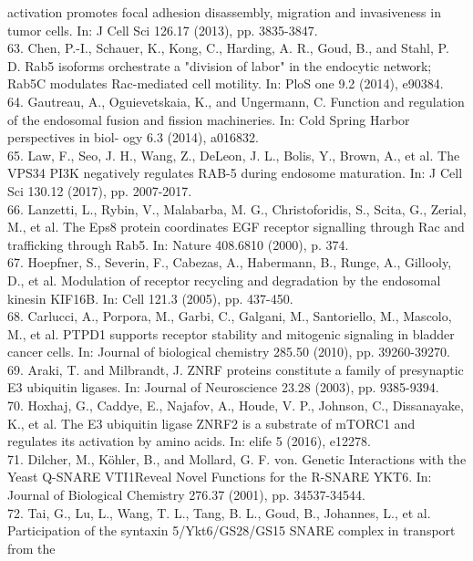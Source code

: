 \documentclass[12pt,english]{article}
\begin{document}
activation promotes focal adhesion disassembly, migration and invasiveness in tumor
cells. In: J Cell Sci 126.17 (2013), pp. 3835-3847.
\\
63. Chen, P.-I., Schauer, K., Kong, C., Harding, A. R., Goud, B., and Stahl, P. D. Rab5
isoforms orchestrate a "division of labor" in the endocytic network; Rab5C modulates
Rac-mediated cell motility. In: PloS one 9.2 (2014), e90384.
\\
64. Gautreau, A., Oguievetskaia, K., and Ungermann, C. Function and regulation of the
endosomal fusion and fission machineries. In: Cold Spring Harbor perspectives in biol-
ogy 6.3 (2014), a016832.
\\
65. Law, F., Seo, J. H., Wang, Z., DeLeon, J. L., Bolis, Y., Brown, A., et al. The VPS34
PI3K negatively regulates RAB-5 during endosome maturation. In: J Cell Sci 130.12
(2017), pp. 2007-2017.
\\
66. Lanzetti, L., Rybin, V., Malabarba, M. G., Christoforidis, S., Scita, G., Zerial, M., et
al. The Eps8 protein coordinates EGF receptor signalling through Rac and trafficking
through Rab5. In: Nature 408.6810 (2000), p. 374.
\\
67. Hoepfner, S., Severin, F., Cabezas, A., Habermann, B., Runge, A., Gillooly, D., et al.
Modulation of receptor recycling and degradation by the endosomal kinesin KIF16B.
In: Cell 121.3 (2005), pp. 437-450.
\\
68. Carlucci, A., Porpora, M., Garbi, C., Galgani, M., Santoriello, M., Mascolo, M., et al.
PTPD1 supports receptor stability and mitogenic signaling in bladder cancer cells.
In: Journal of biological chemistry 285.50 (2010), pp. 39260-39270.
\\
69. Araki, T. and Milbrandt, J. ZNRF proteins constitute a family of presynaptic E3
ubiquitin ligases. In: Journal of Neuroscience 23.28 (2003), pp. 9385-9394.
\\
70. Hoxhaj, G., Caddye, E., Najafov, A., Houde, V. P., Johnson, C., Dissanayake, K., et al.
The E3 ubiquitin ligase ZNRF2 is a substrate of mTORC1 and regulates its activation
by amino acids. In: elife 5 (2016), e12278.
\\
71. Dilcher, M., Köhler, B., and Mollard, G. F. von. Genetic Interactions with the Yeast
Q-SNARE VTI1Reveal Novel Functions for the R-SNARE YKT6. In: Journal of Biological Chemistry 276.37 (2001), pp. 34537-34544.
\\
72. Tai, G., Lu, L., Wang, T. L., Tang, B. L., Goud, B., Johannes, L., et al. Participation
of the syntaxin 5/Ykt6/GS28/GS15 SNARE complex in transport from the
\end{document}

